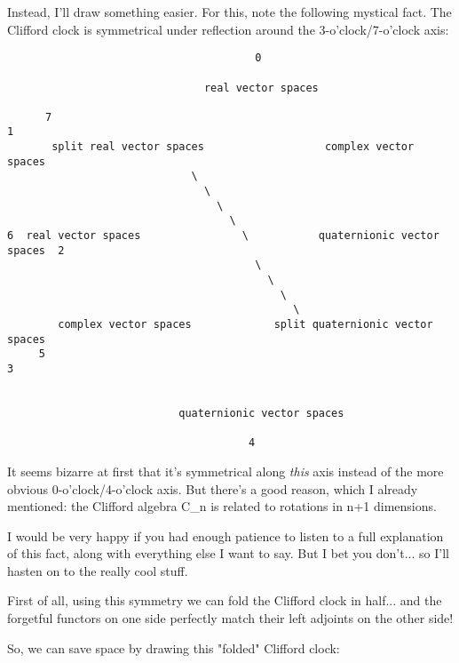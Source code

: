 Instead, I'll draw something easier.  For this, note the following mystical
fact.  The Clifford clock is symmetrical under reflection around the 
3-o'clock/7-o'clock axis:


\begin{verbatim}
                                       0

                               real vector spaces
                                
      7                                                                 1                            
       split real vector spaces                   complex vector spaces
                             \ 
                               \
                                 \
                                   \
6  real vector spaces                \           quaternionic vector spaces  2
                                       \
                                         \
                                           \
                                             \
        complex vector spaces             split quaternionic vector spaces
     5                                                                     3

                             
                           quaternionic vector spaces

                                      4
\end{verbatim}
    
It seems bizarre at first that it's symmetrical along \emph{this} 
axis instead 
of the more obvious 0-o'clock/4-o'clock axis.  But there's a good reason,
which I already mentioned: the Clifford algebra C_{n} is related to rotations in 
n+1 dimensions.  

I would be very happy if you had enough patience to listen to a full 
explanation of this fact, along with everything else I want to say.  But 
I bet you don't... so I'll hasten on to the really cool stuff.

First of all, using this symmetry we can fold the Clifford clock in half... 
and the forgetful functors on one side perfectly match their left adjoints 
on the other side!    

So, we can save space by drawing this "folded" Clifford clock: 


